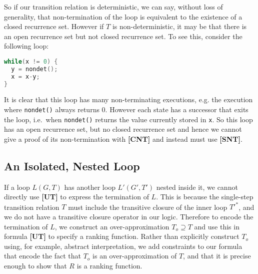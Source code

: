 \documentclass[a4paper]{llncs}
\begin{document}

So if our transition relation is deterministic, we can say, without
loss of generality, that non-termination of the loop is equivalent
to the existence of a closed recurrence set.  However if $T$ is
non-deterministic, it may be that there is an open recurrence
set but not closed recurrence set.  To see this, consider the following
loop:
%
\begin{lstlisting}[language=C]
while(x != 0) {
  y = nondet();
  x = x-y;
}
\end{lstlisting}

It is clear that this loop has many non-terminating executions,
e.g. the execution where \lstinline!nondet()! always returns 0.
However each state has a successor
that exits the loop, i.e.~when \lstinline|nondet()| returns
the value currently stored in \lstinline|x|.  So this loop
has an open recurrence set, but no closed recurrence set
and hence we cannot give a proof of its non-termination
with {\bf [CNT]} and instead must use {\bf [SNT]}.

% 

\subsection{An Isolated, Nested Loop}
 If a loop $L(G, T)$ has another loop $L'(G', T')$ nested inside it, we cannot directly use {\bf [UT]}
to express the termination of $L$.  This is because the single-step transition relation $T$ must
include the transitive closure of the inner loop $T'^*$, and we do not have a transitive closure
operator in our logic.  Therefore to encode the termination of $L$, we construct an over-approximation
$T_o \supseteq T$ and use this in formula {\bf [UT]} to specify a ranking function.
Rather than explicitly construct $T_o$ using, for example, abstract interpretation, we add constraints to
our formula that encode the fact that $T_o$ is an over-approximation of $T$, and that it is
precise enough to show that $R$ is a ranking function.
\end{document}
